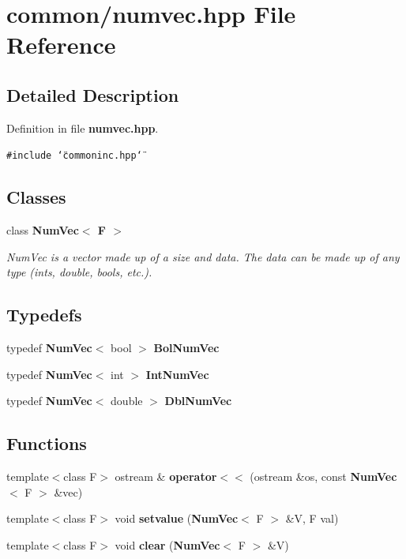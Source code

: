\section{common/numvec.hpp File Reference}
\label{numvec_8hpp}


\subsection{Detailed Description}


Definition in file {\bf numvec.hpp}.

{\tt \#include \char`\"{}commoninc.hpp\char`\"{}}\par
\subsection*{Classes}
\begin{CompactItemize}
\item 
class {\bf Num\-Vec$<$ F $>$}
\begin{CompactList}\small\item\em Num\-Vec is a vector made up of a size and data. The data can be made up of any type (ints, double, bools, etc.). \item\end{CompactList}\end{CompactItemize}
\subsection*{Typedefs}
\begin{CompactItemize}
\item 
typedef {\bf Num\-Vec}$<$ bool $>$ {\bf Bol\-Num\-Vec}
\item 
typedef {\bf Num\-Vec}$<$ int $>$ {\bf Int\-Num\-Vec}
\item 
typedef {\bf Num\-Vec}$<$ double $>$ {\bf Dbl\-Num\-Vec}
\end{CompactItemize}
\subsection*{Functions}
\begin{CompactItemize}
\item 
template$<$class F$>$ ostream \& {\bf operator$<$$<$} (ostream \&os, const {\bf Num\-Vec}$<$ F $>$ \&vec)
\item 
template$<$class F$>$ void {\bf setvalue} ({\bf Num\-Vec}$<$ F $>$ \&V, F val)
\item 
template$<$class F$>$ void {\bf clear} ({\bf Num\-Vec}$<$ F $>$ \&V)
\end{CompactItemize}


